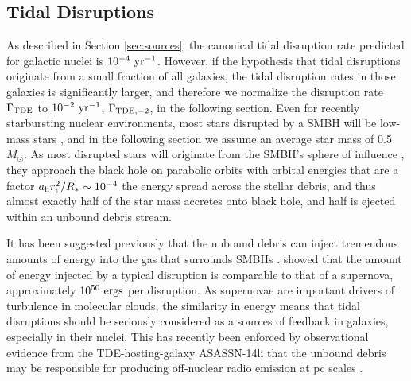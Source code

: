 \documentclass[preprint2]{aastex}
\providecommand{\DIFaddend}{} %
\begin{document}
\DIFaddend \subsection{Tidal Disruptions}\label{subsec:tde}
As described in Section \ref{sec:sources}, the canonical tidal disruption rate predicted for galactic nuclei is $10^{-4}~{\rm yr}^{-1}$. However, if the hypothesis that tidal disruptions originate from a small fraction of all galaxies, the tidal disruption rates in those galaxies is significantly larger, and therefore we normalize the disruption rate $\Gamma_{\rm TDE}$ to $10^{-2}~{\rm yr}^{-1}$, $\Gamma_{\rm TDE, -2}$, in the following section. Even for recently starbursting nuclear environments, most stars disrupted by a SMBH will be low-mass stars \citep{Kochanek:2016a}, and in the following section we assume an average star mass of 0.5 $M_{\odot}$. As most disrupted stars will originate from the SMBH's sphere of influence \citep{Lightman:1977a}, they approach the black hole on parabolic orbits with orbital energies that are a factor $a_{\rm h} r_{\rm t}^{2} / R_{\ast} \sim 10^{-4}$ the energy spread across the stellar debris, and thus almost exactly half of the star mass accretes onto black hole, and half is ejected within an unbound debris stream.

It has been suggested previously that the unbound debris can inject tremendous amounts of energy into the gas that surrounds SMBHs \citep{Khokhlov:1996a}. \citeauthor{Guillochon:2016b} showed that the amount of energy injected by a typical disruption is comparable to that of a supernova, approximately $10^{50}~{\rm ergs}$ per disruption. As supernovae are important drivers of turbulence in molecular clouds, the similarity in energy means that tidal disruptions should be seriously considered as a sources of feedback in galaxies, especially in their nuclei. This has recently been enforced by observational evidence from the TDE-hosting-galaxy ASASSN-14li that the unbound debris may be responsible for producing off-nuclear radio emission at pc scales \citep{Romero-Canizales:2016a}.
\end{document}
